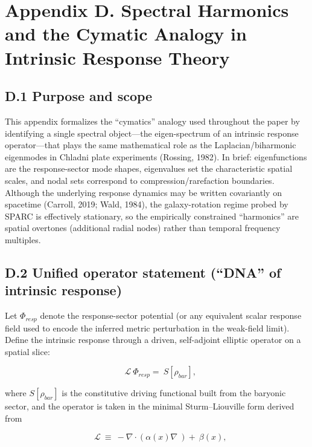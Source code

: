 \documentclass[11pt]{article}
\begin{document}
\section{Appendix D. Spectral Harmonics and the Cymatic Analogy in Intrinsic Response Theory}\label{appendix-d.-spectral-harmonics-and-the-cymatic-analogy-in-intrinsic-response-theory}

\subsection{D.1 Purpose and scope}\label{d.1-purpose-and-scope}

This appendix formalizes the ``cymatics'' analogy used throughout the paper by identifying a single spectral object---the eigen-spectrum of an intrinsic response operator---that plays the same mathematical role as the Laplacian/biharmonic eigenmodes in Chladni plate experiments \citep{Rossing1982Chladni, Tuan2014Nodal} (Rossing, 1982). In brief: eigenfunctions are the response-sector mode shapes, eigenvalues set the characteristic spatial scales, and nodal sets correspond to compression/rarefaction boundaries. Although the underlying response dynamics may be written covariantly on spacetime (Carroll, 2019; Wald, 1984), the galaxy-rotation regime probed by SPARC is effectively stationary, so the empirically constrained ``harmonics'' are spatial overtones (additional radial nodes) rather than temporal frequency multiples.

\subsection{D.2 Unified operator statement (``DNA'' of intrinsic response)}\label{d.2-unified-operator-statement-dna-of-intrinsic-response}

Let \(\Phi_{resp}\) denote the response-sector potential (or any equivalent scalar response field used to encode the inferred metric perturbation in the weak-field limit). Define the intrinsic response through a driven, self-adjoint elliptic operator on a spatial slice:

\[\ \ \ \ \mathcal{L}\ \Phi_{resp} = \ S\left\lbrack \rho_{bar} \right\rbrack,\]

where \(S\left\lbrack \rho_{bar} \right\rbrack\) is the constitutive driving functional built from the baryonic sector, and the operator is taken in the minimal Sturm--Liouville form derived from \citep{BenderOrszag1999, KevorkianCole1996}

\[\ \ \ \ \mathcal{L}\  \equiv \  - \nabla \cdot \left( \alpha(x)\nabla\  \right) + \ \beta(x),\]
\end{document}
